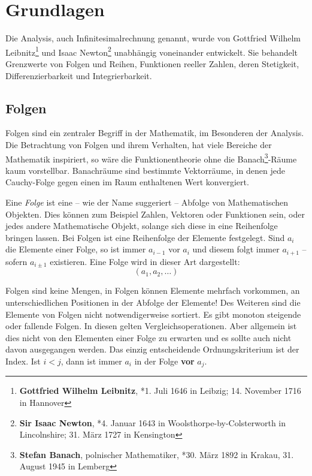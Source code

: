 
\chapter{Grundlagen}

Die Analysis, auch Infinitesimalrechnung genannt, wurde von Gottfried Wilhelm Leibnitz\footnote{\textbf{Gottfried Wilhelm Leibnitz}, *1. Juli 1646 in Leibzig; 14. November 1716 in Hannover} und Isaac Newton\footnote{\textbf{Sir Isaac Newton}, *4. Januar 1643 in Woolsthorpe-by-Colsterworth in Lincolnshire; 31. März 1727 in Kensington} unabhängig voneinander entwickelt. Sie behandelt Grenzwerte von Folgen und Reihen, Funktionen reeller Zahlen, deren Stetigkeit, Differenzierbarkeit und Integrierbarkeit. 

\section{Folgen}

Folgen sind ein zentraler Begriff in der Mathematik, im Besonderen der Analysis. Die Betrachtung von Folgen und ihrem Verhalten, hat viele Bereiche der Mathematik inspiriert, so wäre die Funktionentheorie ohne die Banach\footnote{\textbf{Stefan Banach}, polnischer Mathematiker,  *30. März 1892 in Krakau, 31. August 1945 in Lemberg}-Räume kaum vorstellbar.  Banachräume sind bestimmte Vektorräume, in denen jede Cauchy-Folge gegen einen im Raum enthaltenen Wert konvergiert.

\begin{definition}
Eine \emph{Folge} ist eine -- wie der Name suggeriert -- Abfolge von Mathematischen Objekten. Dies können zum Beispiel Zahlen, Vektoren oder Funktionen sein, oder jedes andere Mathematische Objekt, solange sich diese in eine Reihenfolge bringen lassen. Bei Folgen ist eine Reihenfolge der Elemente festgelegt. Sind $a_i$ die Elemente einer Folge, so ist immer $a_{i-1}$ vor $a_i$ und diesem folgt immer $a_{i+1}$ -- sofern $a_{i\pm 1}$ existieren. Eine Folge wird in dieser Art dargestellt:
\[
(a_1, a_2, \dots)
\]
\end{definition}

Folgen sind keine Mengen, in Folgen können Elemente mehrfach vorkommen, an unterschiedlichen Positionen in der Abfolge der Elemente! Des Weiteren sind die Elemente von Folgen nicht notwendigerweise sortiert. Es gibt monoton steigende oder fallende Folgen. In diesen gelten Vergleichsoperationen. Aber allgemein ist dies nicht von den Elementen einer Folge zu erwarten und es sollte auch nicht davon ausgegangen werden. Das einzig entscheidende Ordnungskriterium ist der Index. Ist $i<j$, dann ist immer $a_i$ in der Folge \textbf{vor} $a_j$.

